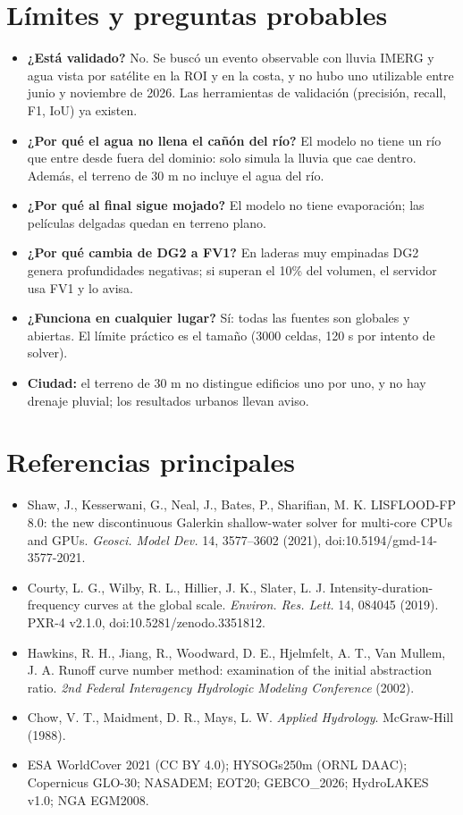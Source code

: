 \documentclass[11pt,letterpaper]{article}
\begin{document}
\section{Límites y preguntas probables}
\begin{itemize}
  \item \textbf{¿Está validado?} No. Se buscó un evento observable con lluvia IMERG y agua vista por satélite en la ROI y en la costa, y no hubo uno utilizable entre junio y noviembre de 2026. Las herramientas de validación (precisión, recall, F1, IoU) ya existen.
  \item \textbf{¿Por qué el agua no llena el cañón del río?} El modelo no tiene un río que entre desde fuera del dominio: solo simula la lluvia que cae dentro. Además, el terreno de 30 m no incluye el agua del río.
  \item \textbf{¿Por qué al final sigue mojado?} El modelo no tiene evaporación; las películas delgadas quedan en terreno plano.
  \item \textbf{¿Por qué cambia de DG2 a FV1?} En laderas muy empinadas DG2 genera profundidades negativas; si superan el 10\% del volumen, el servidor usa FV1 y lo avisa.
  \item \textbf{¿Funciona en cualquier lugar?} Sí: todas las fuentes son globales y abiertas. El límite práctico es el tamaño (3000 celdas, 120 s por intento de solver).
  \item \textbf{Ciudad:} el terreno de 30 m no distingue edificios uno por uno, y no hay drenaje pluvial; los resultados urbanos llevan aviso.
\end{itemize}

\section*{Referencias principales}
{\small
\begin{itemize}
  \item Shaw, J., Kesserwani, G., Neal, J., Bates, P., Sharifian, M. K. LISFLOOD-FP 8.0: the new discontinuous Galerkin shallow-water solver for multi-core CPUs and GPUs. \emph{Geosci. Model Dev.} 14, 3577–3602 (2021), doi:10.5194/gmd-14-3577-2021.
  \item Courty, L. G., Wilby, R. L., Hillier, J. K., Slater, L. J. Intensity-duration-frequency curves at the global scale. \emph{Environ. Res. Lett.} 14, 084045 (2019). PXR-4 v2.1.0, doi:10.5281/zenodo.3351812.
  \item Hawkins, R. H., Jiang, R., Woodward, D. E., Hjelmfelt, A. T., Van Mullem, J. A. Runoff curve number method: examination of the initial abstraction ratio. \emph{2nd Federal Interagency Hydrologic Modeling Conference} (2002).
  \item Chow, V. T., Maidment, D. R., Mays, L. W. \emph{Applied Hydrology}. McGraw-Hill (1988).
  \item ESA WorldCover 2021 (CC BY 4.0); HYSOGs250m (ORNL DAAC); Copernicus GLO-30; NASADEM; EOT20; GEBCO\_2026; HydroLAKES v1.0; NGA EGM2008.
\end{itemize}
}
\end{document}
